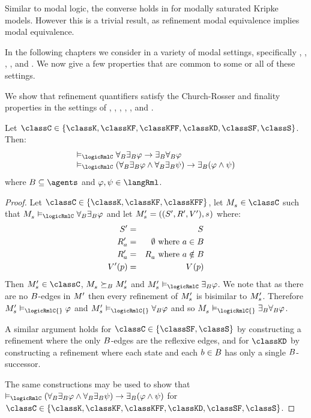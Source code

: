 Similar to modal logic, the converse holds in \logicRml{} for modally saturated Kripke models.
However this is a trivial result, as refinement modal equivalence implies modal equivalence.

In the following chapters we consider \logicRml{} in a variety of modal settings, specifically \classK{}, \classKF{}, \classKFF{}, \classKD{}, and \classS{}.
We now give a few properties that are common to some or all of these settings.

We show that refinement quantifiers satisfy the Church-Rosser and finality properties in the settings of \classK{}, \classKF{}, \classKFF{}, \classKD{}, \classSF{}, and \classS{}.

\begin{proposition}\label{rml-mckinsey}
Let $\classC \in \{\classK, \classKF, \classKFF, \classKD, \classSF, \classS\}$. Then:
$$
\begin{array}{l}
    \entails_\logicRmlC \allrefsBs \somerefsBs \phi \implies \somerefsBs \allrefsBs \phi\\
    \entails_\logicRmlC (\allrefsBs \somerefsBs \phi \land \allrefsBs \somerefsBs \psi) \implies \somerefsBs (\phi \land \psi)
\end{array}
$$
where $\agentsB \subseteq \agents$ and $\phi, \psi \in \langRml$.
\end{proposition}

\begin{proof}
Let $\classC \in \{\classK, \classKF, \classKFF\}$, let $\kPModel{\kStateS} \in \classC$ such that $\kPModel{\kStateS} \entails_\logicRmlC \allrefsBs \somerefsBs \phi$ and let $\kPModelAndTupleP{\kStateS}$ where:
\begin{eqnarray*}
    \kStatesP &=& \kStates\\
    \kAccessibilityPA &=& \emptyset \text{ where } \agentA \in \agentsB\\
    \kAccessibilityPA &=& \kAccessibilityA \text{ where } \agentA \notin \agentsB\\
    \kValuationP(\atomP) &=& \kValuation(\atomP)
\end{eqnarray*}
Then $\kPModelP{\kStateS} \in \classC$, $\kPModel{\kStateS} \simulatesBs \kPModelP{\kStateS}$ and $\kPModelP{\kStateS} \entails_\logicRmlC \somerefsBs \phi$.
We note that as there are no $B$-edges in ${M^{\prime}_{}}$ then every refinement of $\kPModelP{\kStateS}$ is bisimilar to $\kPModelP{\kStateS}$.
Therefore $\kPModelP{\kStateS} \entails_\logicRmlC{} \phi$ and $\kPModelP{\kStateS} \entails_\logicRmlC{} \allrefsBs \phi$ and so $\kPModel{\kStateS} \entails_\logicRmlC{} \somerefsBs \allrefsBs \phi$.

A similar argument holds for $\classC \in \{\classSF, \classS\}$ by constructing a refinement where the only $B$-edges are the reflexive edges,
and for $\classKD$ by constructing a refinement where each state and each $b \in B$ has only a single $B$-successor.

The same constructions may be used to show that $\entails_\logicRmlC (\allrefsBs \somerefsBs \phi \land \allrefsBs \somerefsBs \psi) \implies \somerefsBs (\phi \land \psi)$ for $\classC \in \{\classK, \classKF, \classKFF, \classKD, \classSF, \classS\}$.
\end{proof}

